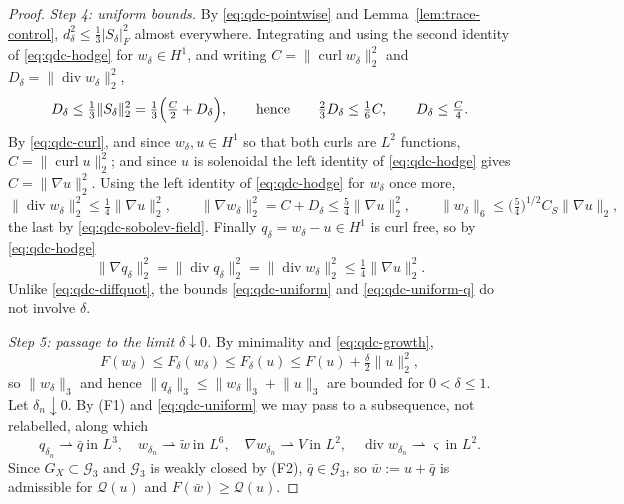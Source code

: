 \documentclass[11pt]{article}
\theoremstyle{definition}
\theoremstyle{plain}
\newcommand{\norm}[1]{\lVert #1\rVert}
\begin{document}
\begin{proof}
\emph{Step 4: uniform bounds.}  By \eqref{eq:qdc-pointwise} and
Lemma~\ref{lem:trace-control}, $d_\delta^2\le\frac13|S_\delta|_F^2$ almost
everywhere.  Integrating and using the second identity of
\eqref{eq:qdc-hodge} for $w_\delta\in H^1$, and writing
$C=\norm{\operatorname{curl}w_\delta}_2^2$ and
$D_\delta=\norm{\operatorname{div}w_\delta}_2^2$,
\[
 D_\delta\le\tfrac13\norm{S_\delta}_2^2
 =\tfrac13\Bigl(\tfrac C2+D_\delta\Bigr),
 \qquad\text{hence}\qquad
 \tfrac23D_\delta\le\tfrac16C,
 \qquad D_\delta\le\tfrac C4 .
\]
By \eqref{eq:qdc-curl}, and since $w_\delta,u\in H^1$ so that both curls are
$L^2$ functions, $C=\norm{\operatorname{curl}u}_2^2$; and since $u$ is
solenoidal the left identity of \eqref{eq:qdc-hodge} gives
$C=\norm{\nabla u}_2^2$.  Using the left identity of \eqref{eq:qdc-hodge}
for $w_\delta$ once more,
\begin{equation}\label{eq:qdc-uniform}
 \norm{\operatorname{div}w_\delta}_2^2\le\tfrac14\norm{\nabla u}_2^2,
 \qquad
 \norm{\nabla w_\delta}_2^2=C+D_\delta\le\tfrac54\norm{\nabla u}_2^2,
 \qquad
 \norm{w_\delta}_6\le\bigl(\tfrac54\bigr)^{1/2}C_S\norm{\nabla u}_2 ,
\end{equation}
the last by \eqref{eq:qdc-sobolev-field}.  Finally $q_\delta=w_\delta-u\in H^1$
is curl free, so by \eqref{eq:qdc-hodge}
\begin{equation}\label{eq:qdc-uniform-q}
 \norm{\nabla q_\delta}_2^2=\norm{\operatorname{div}q_\delta}_2^2
 =\norm{\operatorname{div}w_\delta}_2^2\le\tfrac14\norm{\nabla u}_2^2 .
\end{equation}
Unlike \eqref{eq:qdc-diffquot}, the bounds \eqref{eq:qdc-uniform} and
\eqref{eq:qdc-uniform-q} do not involve $\delta$.

\emph{Step 5: passage to the limit $\delta\downarrow0$.}  By minimality and
\eqref{eq:qdc-growth},
\begin{equation}\label{eq:qdc-energybound}
 F(w_\delta)\le F_\delta(w_\delta)\le F_\delta(u)
 \le F(u)+\tfrac\delta2\norm u_2^2 ,
\end{equation}
so $\norm{w_\delta}_3$ and hence $\norm{q_\delta}_3\le\norm{w_\delta}_3+\norm u_3$
are bounded for $0<\delta\le1$.  Let $\delta_n\downarrow0$.  By (F1) and
\eqref{eq:qdc-uniform} we may pass to a subsequence, not relabelled, along
which
\[
 q_{\delta_n}\rightharpoonup\bar q\ \text{in }L^3,\quad
 w_{\delta_n}\rightharpoonup\tilde w\ \text{in }L^6,\quad
 \nabla w_{\delta_n}\rightharpoonup V\ \text{in }L^2,\quad
 \operatorname{div}w_{\delta_n}\rightharpoonup\varsigma\ \text{in }L^2 .
\]
Since $G_X\subset\mathcal G_3$ and $\mathcal G_3$ is weakly closed by (F2),
$\bar q\in\mathcal G_3$, so $\bar w:=u+\bar q$ is admissible for
$\mathcal Q(u)$ and $F(\bar w)\ge\mathcal Q(u)$.


\end{proof}
\end{document}
